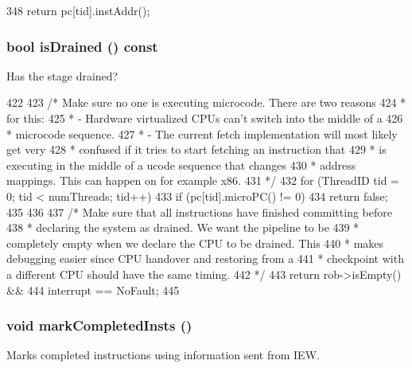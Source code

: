 \begin{DoxyCode}
348 { return pc[tid].instAddr(); }
\end{DoxyCode}
\hypertarget{classDefaultCommit_adf5473c18a3d7c1e88c4a2072bce5526}{
\subsubsection[{isDrained}]{\setlength{\rightskip}{0pt plus 5cm}bool isDrained () const}}
\label{classDefaultCommit_adf5473c18a3d7c1e88c4a2072bce5526}
Has the stage drained? 


\begin{DoxyCode}
422 {
423     /* Make sure no one is executing microcode. There are two reasons
424      * for this:
425      * - Hardware virtualized CPUs can't switch into the middle of a
426      *   microcode sequence.
427      * - The current fetch implementation will most likely get very
428      *   confused if it tries to start fetching an instruction that
429      *   is executing in the middle of a ucode sequence that changes
430      *   address mappings. This can happen on for example x86.
431      */
432     for (ThreadID tid = 0; tid < numThreads; tid++) {
433         if (pc[tid].microPC() != 0)
434             return false;
435     }
436 
437     /* Make sure that all instructions have finished committing before
438      * declaring the system as drained. We want the pipeline to be
439      * completely empty when we declare the CPU to be drained. This
440      * makes debugging easier since CPU handover and restoring from a
441      * checkpoint with a different CPU should have the same timing.
442      */
443     return rob->isEmpty() &&
444         interrupt == NoFault;
445 }
\end{DoxyCode}
\hypertarget{classDefaultCommit_a035349a9fd8a12938e7997be5a76211e}{
\subsubsection[{markCompletedInsts}]{\setlength{\rightskip}{0pt plus 5cm}void markCompletedInsts ()}}
\label{classDefaultCommit_a035349a9fd8a12938e7997be5a76211e}
Marks completed instructions using information sent from IEW. 


